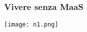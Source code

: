 \begin{frame}
  \frametitle{Vivere senza MaaS}
  \centering
  \texttt{[image: n1.png]}
\end{frame}


